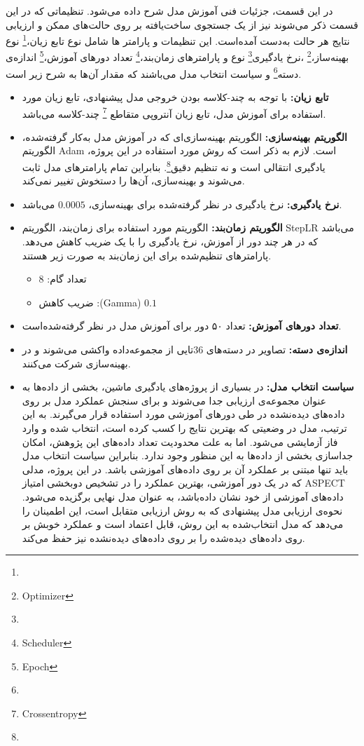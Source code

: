 
در این قسمت، جزئیات فنی آموزش مدل شرح داده می‌شود.
تنظیماتی که در این قسمت ذکر می‌شوند نیز از یک جستجوی ساخت‌یافته بر روی حالت‌های ممکن و ارزیابی نتایج هر حالت به‌دست آمده‌است.
این تنظیمات و پارامتر ها شامل 
نوع تابع زیان،\footnote{}
نوع بهینه‌ساز،\footnote{Optimizer}
،نرخ یادگیری\footnote{}
نوع و پارامتر‌های زمان‌بند،\footnote{Scheduler}
تعداد دور‌های آموزش،\footnote{Epoch}
اندازه‌ی دسته\footnote{}
و 
سیاست انتخاب مدل می‌باشند که مقدار آن‌ها به شرح زیر است.

\begin{itemize}
    \item \textbf{تابع زیان:} با توجه به چند-کلاسه بودن خروجی مدل پیشنهادی، تابع زیان مورد استفاده برای آموزش مدل، تابع زیان آنتروپی متقاطع
    \footnote{Crossentropy}
    چند-کلاسه می‌باشد.
    \item \textbf{الگوریتم بهینه‌سازی:} الگوریتم بهینه‌سازی‌ای که در آموزش مدل به‌کار گرفته‌شده، الگوریتم Adam است.
    لازم به ذکر است که روش مورد استفاده در این پروژه، یادگیری انتقالی است و نه تنظیم دقیق\footnote{}. بنابراین تمام پارامتر‌های مدل  ثابت می‌شوند و بهینه‌سازی، آن‌ها را دستخوش تغییر نمی‌کند.
    \item \textbf{نرخ یادگیری:} نرخ یادگیری در نظر گرفته‌شده برای بهینه‌سازی، $0.0005$ می‌باشد.
    \item \textbf{الگوریتم زمان‌بند:} الگوریتم مورد استفاده برای زمان‌بند، الگوریتم StepLR می‌باشد که در هر چند دور از آموزش، نرخ یادگیری را با یک ضریب کاهش می‌دهد. پارامتر‌های تنظیم‌شده برای این زمان‌بند به صورت زیر هستند.
    \begin{itemize}
        \item تعداد گام: 8
        \item ضریب کاهش :(Gamma) $0.1$
    \end{itemize}
    \item \textbf{تعداد دور‌های آموزش:} تعداد ۵۰ دور برای آموزش مدل در نظر گرفته‌شده‌است.
    \item \textbf{اندازه‌ی دسته:} تصاویر در دسته‌های 36تایی از مجموعه‌داده واکشی می‌شوند و در بهینه‌سازی شرکت می‌کنند.
    \item \textbf{سیاست انتخاب مدل:} در بسیاری از پروژه‌های یادگیری ماشین، بخشی از داده‌ها به عنوان مجموعه‌ی ارزیابی جدا می‌شوند و برای سنجش عملکرد مدل بر روی داده‌های دیده‌نشده در طی دور‌های آموزشی مورد استفاده قرار می‌گیرند.
    به این ترتیب، مدل در وضعیتی که بهترین نتایج را کسب کرده است، انتخاب شده و وارد فاز آزمایشی می‌شود.
    اما به علت محدودیت تعداد داده‌های این پژوهش، امکان جداسازی بخشی از داده‌ها به این منظور وجود ندارد.
    بنابراین سیاست انتخاب مدل باید تنها مبتنی بر عملکرد آن بر روی داده‌های آموزشی باشد.
    در این پروژه، مدلی که در یک دور آموزشی، بهترین عملکرد را در تشخیص دوبخشی امتیاز ASPECT داده‌های آموزشی از خود نشان داده‌باشد، به عنوان مدل نهایی برگزیده می‌شود.
    نحوه‌ی ارزیابی مدل پیشنهادی که به روش ارزیابی متقابل است، این اطمینان را می‌دهد که مدل انتخاب‌شده به این روش، قابل اعتماد است و عملکرد خوبش بر روی داده‌های دیده‌شده را بر روی داده‌های دیده‌نشده نیز حفظ می‌کند.
\end{itemize}


